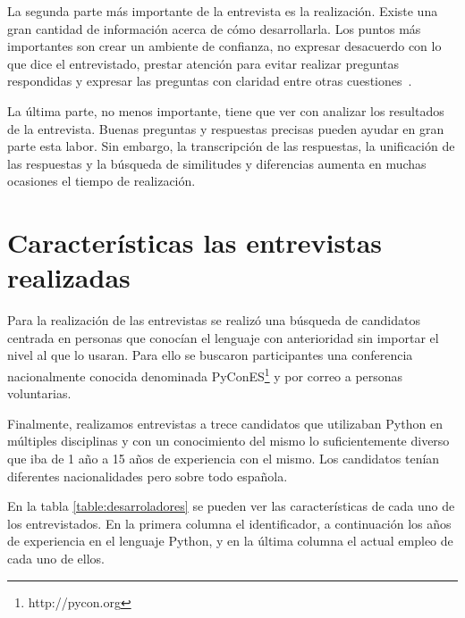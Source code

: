 \documentclass[a4paper, 12pt]{book}
\begin{document}
La segunda parte más importante de la entrevista es la realización. Existe una gran cantidad de información acerca de cómo desarrollarla. Los puntos más importantes son crear un ambiente de confianza, no expresar desacuerdo con lo que dice el entrevistado, prestar atención para evitar realizar preguntas respondidas y expresar las preguntas con claridad entre otras cuestiones~\cite{kvale1996interviews}.

La última parte, no menos importante, tiene que ver con analizar los resultados de la entrevista. Buenas preguntas y respuestas precisas pueden ayudar en gran parte esta labor. Sin embargo, la transcripción de las respuestas, la unificación de las respuestas y la búsqueda de similitudes y diferencias aumenta en muchas ocasiones el tiempo de realización.


\section{Características las entrevistas realizadas}

Para la realización de las entrevistas se realizó una búsqueda de candidatos centrada en personas que conocían el lenguaje con anterioridad sin importar el nivel al que lo usaran. Para ello se buscaron participantes una conferencia nacionalmente conocida denominada PyConES\footnote{http://pycon.org} y por correo a personas voluntarias.

Finalmente, realizamos entrevistas a trece candidatos que utilizaban Python en múltiples disciplinas y con un conocimiento del mismo lo suficientemente diverso que iba de 1 año a 15 años de experiencia con el mismo. Los candidatos tenían diferentes nacionalidades pero sobre todo española.

En la tabla \ref{table:desarroladores} se pueden ver las características de cada uno de los entrevistados. En la primera columna el identificador, a continuación los años de experiencia en el lenguaje Python, y en la última columna el actual empleo de cada uno de ellos.
\end{document}
